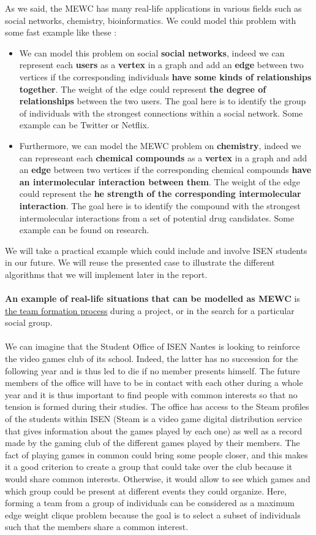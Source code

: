     As we said, the MEWC has many real-life applications in various fields such as social networks, chemistry, bioinformatics. We could model this problem with some fast example like these :
    \begin{itemize}
        \item We can model this problem on social \textbf{social networks}, indeed we can represent each \textbf{users} as a \textbf{vertex} in a graph and add an \textbf{edge} between two vertices if the corresponding individuals \textbf{have some kinds of relationships together}. The weight of the edge could represent \textbf{the degree of relationships} between the two users. The goal here is to identify the group of individuals with the strongest connections within a social network. Some example can be Twitter or Netflix.
        \item Furthermore, we can model the MEWC problem on \textbf{chemistry}, indeed we can represeant each \textbf{chemical compounds} as a \textbf{vertex} in a graph and add an \textbf{edge} between two vertices if the corresponding chemical compounds \textbf{have an intermolecular interaction between them}. The weight of the edge could represent the \textbf{he strength of the corresponding intermolecular interaction}. The goal here is to identify the compound with the strongest intermolecular interactions from a set of potential drug candidates. Some example can be found on research. 
    \end{itemize}
    We will take a practical example which could include and involve ISEN students in our future. We will reuse the presented case to illustrate the different algorithms that we will implement later in the report.\\ \\
    \textbf{An example of real-life situations that can be modelled as MEWC} is \ul{the team formation process} during a project, or in the search for a particular social group. 
    \\ \\
    We can imagine that the Student Office of ISEN Nantes is looking to reinforce the video games club of its school. Indeed, the latter has no succession for the following year and is thus led to die if no member presents himself. The future members of the office will have to be in contact with each other during a whole year and it is thus important to find people with common interests so that no tension is formed during their studies. The office has access to the Steam profiles of the students within ISEN (Steam is a video game digital distribution service that gives information about the games played by each one) as well as a record made by the gaming club of the different games played by their members. The fact of playing games in common could bring some people closer, and this makes it a good criterion to create a group that could take over the club because it would share common interests. Otherwise, it would allow to see which games and which group could be present at different events they could organize. Here, forming a team from a group of individuals can be considered as a maximum edge weight clique problem because the goal is to select a subset of individuals such that the members share a common interest.
